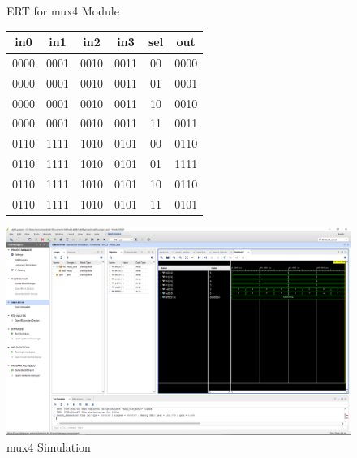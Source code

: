 \documentclass[11pt]{article}
\begin{document}
\begin{figure}[ht]\centering
		\caption{ERT for mux4 Module}
		\label{tbl:example_table}
		\begin{tabular}{ccccc|c}
			\toprule
			in0 & in1 & in2 & in3 & sel & out \\
			\midrule
			0000 & 0001 & 0010 & 0011 & 00 & 0000 \\
			0000 & 0001 & 0010 & 0011 & 01 & 0001 \\
			0000 & 0001 & 0010 & 0011 & 10 & 0010 \\
			0000 & 0001 & 0010 & 0011 & 11 & 0011 \\
			0110 & 1111 & 1010 & 0101 & 00 & 0110 \\
			0110 & 1111 & 1010 & 0101 & 01 & 1111 \\
			0110 & 1111 & 1010 & 0101 & 10 & 0110 \\
			0110 & 1111 & 1010 & 0101 & 11 & 0101 \\
			\bottomrule
		\end{tabular} 
\includegraphics[width=1\textwidth,trim=19cm 15cm 0.5cm 4.5cm,clip]{mux4_test_screenshot}
	\caption{mux4 Simulation}
	\label{fig:sim_with_table}
\end{figure}
\end{document}
